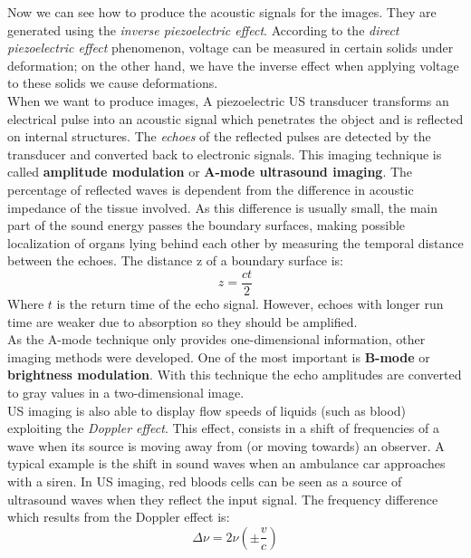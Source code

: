 Now we can see how to produce the acoustic signals for the images. They are generated using the \textit{inverse piezoelectric effect}. According to the \textit{direct piezoelectric effect} phenomenon, voltage can be measured in certain solids under deformation; on the other hand, we have the inverse effect when applying voltage to these solids we cause deformations.\\
When we want to produce images, A piezoelectric US transducer transforms an electrical pulse into an acoustic signal which penetrates the object and is reflected on internal structures. The \textit{echoes} of the reflected pulses are detected by the transducer and converted back to electronic signals. This imaging technique is called \textbf{amplitude modulation} or \textbf{A-mode ultrasound imaging}. The percentage of reflected waves is dependent from the difference in acoustic impedance of the tissue involved. As this difference is usually small, the main part of the sound energy passes the boundary surfaces, making possible localization of organs lying behind each other by measuring the temporal distance between the echoes. The distance z of a boundary surface is:
\begin{equation}
 z = \frac{ct}{2}
\end{equation}
Where $t$ is the return time of the echo signal. However, echoes with longer run time are weaker due to absorption so they should be amplified.\\

As the A-mode technique only provides one-dimensional information, other imaging methods were developed. One of the most important is \textbf{B-mode} or \textbf{brightness modulation}. With this technique the echo amplitudes are converted to gray values in a two-dimensional image.\\

US imaging is also able to display flow speeds of liquids (such as blood) exploiting the \textit{Doppler effect}. This effect, consists in a shift of frequencies of a wave when its source is moving away from (or moving towards) an observer. A typical example is the shift in sound waves when an ambulance car approaches with a siren. In US imaging, red bloods cells can be seen as a source of ultrasound waves when they reflect the input signal. The frequency difference which results from the Doppler effect is:
\begin{equation}
 \Delta \nu = 2 \nu (\pm \frac{v}{c})
\end{equation}

